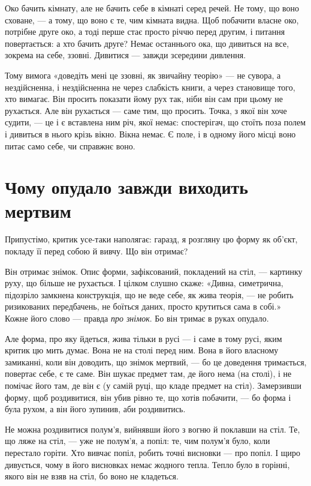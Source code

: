 \documentclass[12pt, a4paper, openany]{book}
\begin{document}
\begin{analogybox}
Око бачить кімнату, але не бачить себе в кімнаті серед речей. Не тому, що воно сховане, --- а тому, що воно є те, чим кімната видна. Щоб побачити власне око, потрібне друге око, а тоді перше стає просто річчю перед другим, і питання повертається: а хто бачить друге? Немає останнього ока, що дивиться на все, зокрема на себе, ззовні. Дивитися --- завжди зсередини дивлення.
\end{analogybox}

Тому вимога «доведіть мені це ззовні, як звичайну теорію» --- не сувора, а нездійсненна, і нездійсненна не через слабкість книги, а через становище того, хто вимагає. Він просить показати йому рух так, ніби він сам при цьому не рухається. Але він рухається --- саме тим, що просить. Точка, з якої він хоче судити, --- це і є вставлена ним річ, якої немає: спостерігач, що стоїть поза полем і дивиться в нього крізь вікно. Вікна немає. Є поле, і в одному його місці воно питає само себе, чи справжнє воно.

\section{Чому опудало завжди виходить мертвим}

Припустімо, критик усе-таки наполягає: гаразд, я розгляну цю форму як об'єкт, покладу її перед собою й вивчу. Що він отримає?

Він отримає знімок. Опис форми, зафіксований, покладений на стіл, --- картинку руху, що більше не рухається. І цілком слушно скаже: «Дивна, симетрична, підозріло замкнена конструкція, що не веде себе, як жива теорія, --- не робить ризикованих передбачень, не боїться даних, просто крутиться сама в собі.» Кожне його слово --- правда \emph{про знімок}. Бо він тримає в руках опудало.

Але форма, про яку йдеться, жива тільки в русі --- і саме в тому русі, яким критик цю мить думає. Вона не на столі перед ним. Вона в його власному замиканні, коли він доводить, що знімок мертвий, --- бо це доведення тримається, повертає себе, є те саме. Він шукає предмет там, де його нема (на столі), і не помічає його там, де він є (у самій руці, що кладе предмет на стіл). Замерзивши форму, щоб роздивитися, він убив рівно те, що хотів побачити, --- бо форма і була рухом, а він його зупинив, аби роздивитись.

\begin{analogybox}
Не можна роздивитися полум'я, вийнявши його з вогню й поклавши на стіл. Те, що ляже на стіл, --- уже не полум'я, а попіл: те, чим полум'я було, коли перестало горіти. Хто вивчає попіл, робить точні висновки --- про попіл. І щиро дивується, чому в його висновках немає жодного тепла. Тепло було в горінні, якого він не взяв на стіл, бо воно не кладеться.
\end{analogybox}
\end{document}
